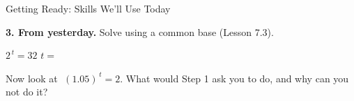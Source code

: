 \documentclass[10pt]{article}
\begin{document}
\begin{notesbox}{Getting Ready: Skills We'll Use Today}
\vspace{0.22in}

\textbf{3. From yesterday.} Solve using a common base (Lesson 7.3).

\vspace{4pt}
\hspace*{1.2em} $2^{\,t} = 32$ \hfill $t=$ \blank{2.0cm}

\vspace{6pt}
\hspace*{1.2em} Now look at $\;(1.05)^{\,t} = 2$. \; What would Step 1 ask you to do, and why can you
not do it? \writeline

\end{notesbox}
\end{document}

